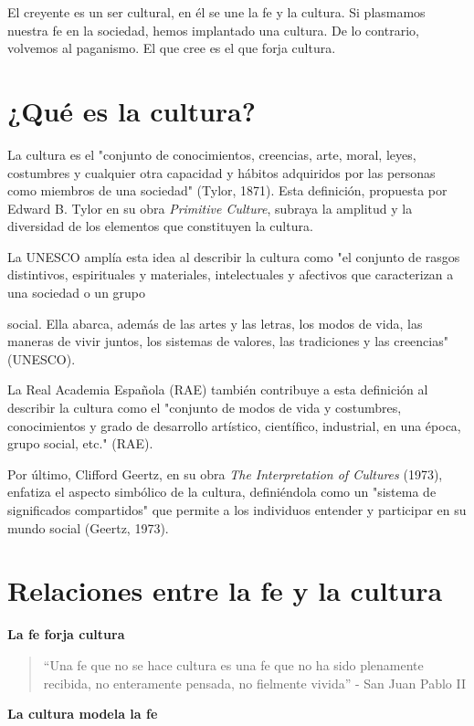 \documentclass[a4paper,12pt,oneside]{article}
\begin{document}
El creyente es un ser cultural, en él se une la fe y la cultura. Si plasmamos nuestra fe en la sociedad, hemos implantado una cultura. De lo contrario, volvemos al paganismo. El que cree es el que forja cultura.

\section*{¿Qué es la cultura?}

La cultura es el "conjunto de conocimientos, creencias, arte, moral, leyes, costumbres y cualquier otra capacidad y hábitos adquiridos por las personas como miembros de una sociedad" (Tylor, 1871). Esta definición, propuesta por Edward B. Tylor en su obra \textit{Primitive Culture}, subraya la amplitud y la diversidad de los elementos que constituyen la cultura.

La UNESCO amplía esta idea al describir la cultura como "el conjunto de rasgos distintivos, espirituales y materiales, intelectuales y afectivos que caracterizan a una sociedad o un grupo

 social. Ella abarca, además de las artes y las letras, los modos de vida, las maneras de vivir juntos, los sistemas de valores, las tradiciones y las creencias" (UNESCO).

La Real Academia Española (RAE) también contribuye a esta definición al describir la cultura como el "conjunto de modos de vida y costumbres, conocimientos y grado de desarrollo artístico, científico, industrial, en una época, grupo social, etc." (RAE).

Por último, Clifford Geertz, en su obra \textit{The Interpretation of Cultures} (1973), enfatiza el aspecto simbólico de la cultura, definiéndola como un "sistema de significados compartidos" que permite a los individuos entender y participar en su mundo social (Geertz, 1973).

\section*{Relaciones entre la fe y la cultura}

\textbf{La fe forja cultura}

\begin{quote}
“Una fe que no se hace cultura es una fe que no ha sido plenamente recibida, no enteramente pensada, no fielmente vivida” - San Juan Pablo II
\end{quote}

\textbf{La cultura modela la fe}
\end{document}
